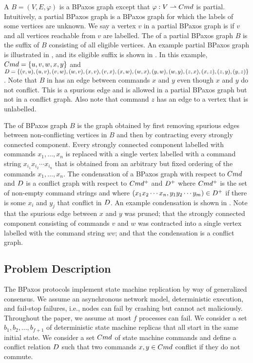 A  $B = (V, E, \varphi)$ is a BPaxos graph except
that $\varphi: V \rightharpoonup Cmd$ is partial. Intuitively, a partial BPaxos
graph is a BPaxos graph for which the labels of some vertices are unknown.
%
We say a vertex $v$ in a partial BPaxos graph is  if $v$ and
all vertices reachable from $v$ are labelled. The  of
a partial BPaxos graph $B$ is the suffix of $B$ consisting of all eligible
vertices.
%
An example partial BPaxos graph is illustrated in ,
and its eligible suffix is shown in . In this example,
$Cmd = \{u, v, w, x, y\}$ and
  $D = \{
    (v, u), (u, v),
    (v, w), (w, v),
    (x, v), (v, x),
    (x, w), (w, x),
    (y, w), (w, y),
    (z, x), (x, z),
    (z, y), (y, z)
  \}$.
Note that $B$ in  has an edge between commands $x$
and $y$ even though $x$ and $y$ do not conflict. This is a spurious edge and is
allowed in a partial BPaxos graph but not in a conflict graph. Also note that
command $z$ has an edge to a vertex that is unlabelled.



The  of BPaxos graph $B$ is the graph obtained by first
removing spurious edges between non-conflicting vertices in $B$ and then by
contracting every strongly connected component. Every strongly connected
component labelled with commands $x_1, \ldots, x_n$ is replaced with a single
vertex labelled with a command string $x_{i_1} x_{i_2} \cdots x_{i_n}$ that is
obtained from an arbitrary but fixed ordering of the commands $x_1, \ldots,
x_n$.
%
The condensation of a BPaxos graph with respect to $Cmd$ and $D$ is
a conflict graph with respect to $Cmd^+$ and $D^+$ where $Cmd^+$ is
the set of non-empty command strings and where $(x_1 x_2 \cdots x_n, y_1 y_2
\cdots y_m) \in D^+$ if there is some $x_i$ and $y_j$ that conflict in
$D$.
%
An example condensation is shown in . Note that the
spurious edge between $x$ and $y$ was pruned; that the strongly connected
component consisting of commands $v$ and $w$ was contracted into a single
vertex labelled with the command string $wv$; and that the condensation is a
conflict graph.

\subsection{Problem Description}
The BPaxos protocols implement state machine replication by way of generalized
consensus. We assume an asynchronous network model, deterministic execution,
and fail-stop failures, i.e., nodes can fail by crashing but cannot act
maliciously. Throughout the paper, we assume at most $f$ processes can fail. We
consider a set $b_1, b_2, \ldots, b_{f+1}$ of deterministic state machine
replicas that all start in the same initial state. We consider a set $Cmd$ of
state machine commands and define a conflict relation $D$ such that two
commands $x, y \in Cmd$ conflict if they do not commute.

